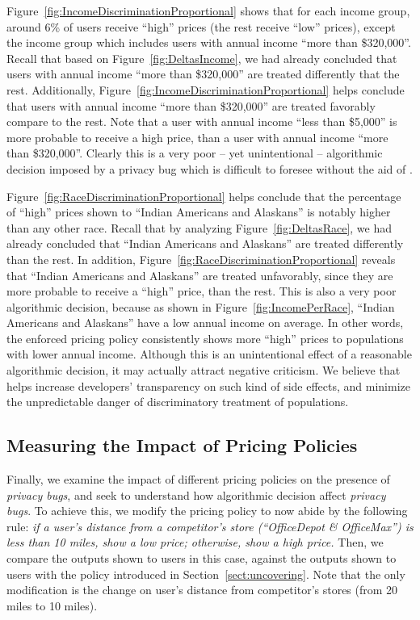 Figure~\ref{fig:IncomeDiscriminationProportional} shows that for each income
group, around 6\% of users receive ``high'' prices (the rest receive ``low''
prices), except the income group which includes users with annual income
``more than \$320,000''. Recall that based on Figure~\ref{fig:DeltasIncome}, we
had already concluded that users with annual income ``more than \$320,000'' are
treated differently that the rest. Additionally,
Figure~\ref{fig:IncomeDiscriminationProportional} helps conclude that users with
annual income ``more than \$320,000'' are treated favorably compare to the rest.
Note that a user with annual income ``less than \$5,000'' is more probable to
receive a high price, than a user with annual income ``more than \$320,000''.
Clearly this is a very poor -- yet unintentional -- algorithmic decision imposed
by a privacy bug which is difficult to foresee without the aid of \sysname.


Figure~\ref{fig:RaceDiscriminationProportional} helps conclude that the
percentage of ``high'' prices shown to ``Indian Americans and Alaskans'' is
notably higher than any other race. Recall that by analyzing
Figure~\ref{fig:DeltasRace}, we had already concluded that
``Indian Americans and Alaskans'' are treated differently than the rest.
In addition, Figure~\ref{fig:RaceDiscriminationProportional} reveals that
``Indian Americans and Alaskans'' are treated unfavorably, since they are
more probable to receive a ``high'' price, than the rest. This is also a very
poor algorithmic decision, because as shown in Figure~\ref{fig:IncomePerRace},
``Indian Americans and Alaskans'' have a low annual income on average. In
other words, the enforced pricing policy consistently shows more
``high'' prices to populations with lower annual income.
Although this is an unintentional effect of a reasonable algorithmic decision,
it may actually attract negative criticism. We believe that \sysname helps
increase developers' transparency on such kind of side effects, and minimize
the unpredictable danger of discriminatory treatment of populations.

\subsection{\normalsize Measuring the Impact of Pricing Policies}
Finally, we examine the impact of different pricing policies on the presence
of {\em privacy bugs}, and seek to understand how algorithmic decision
affect {\em privacy bugs}. To achieve this, we modify the pricing policy
to now abide by the following rule: {\it if a user's distance from a
competitor's store (``OfficeDepot \& OfficeMax'') is less than 10 miles,
show a low price; otherwise, show a high price.} Then, we compare the outputs
shown to users in this case, against the outputs shown to users with the policy
introduced in Section~\ref{sect:uncovering}. Note that the only modification 
is the change on user's distance from competitor's stores (from 20 miles
to 10 miles).

